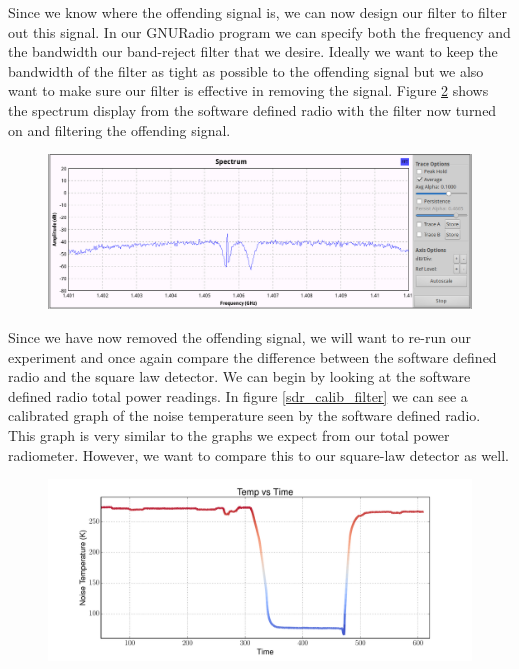{\begin{figure}[h!tb]
\label{spectrum_interfering}
\end{figure}

Since we know where the offending signal is, we can now design our filter to filter out this signal.  In our GNURadio program we can specify both the frequency and the bandwidth our band-reject filter that we desire.  Ideally we want to keep the bandwidth of the filter as tight as possible to the offending signal but we also want to make sure our filter is effective in removing the signal.  Figure \ref{spectrum_filter} shows the spectrum display from the software defined radio with the filter now turned on and filtering the offending signal.

\begin{figure}[h!tb] \centering

\includegraphics[width=\textwidth]{Images/spectrum_filter.png}

\label{spectrum_filter}
\end{figure}

Since we have now removed the offending signal, we will want to re-run our experiment and once again compare the difference between the software defined radio and the square law detector. We can begin by looking at the software defined radio total power readings.  In figure \ref{sdr_calib_filter} we can see a calibrated graph of the noise temperature seen by the software defined radio.  This graph is very similar to the graphs we expect from our total power radiometer.  However, we want to compare this to our square-law detector as well.  

\begin{figure}[h!tb] \centering

\includegraphics[width=\textwidth]{Experiments/Exp4/calib_filtered.pdf}


\end{figure}}

